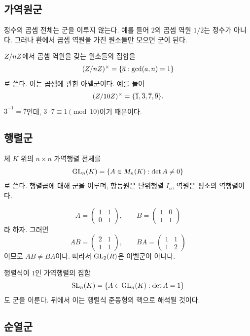 \subsection{가역원군}

정수의 곱셈 전체는 군을 이루지 않는다. 예를 들어 $2$의 곱셈 역원 $1/2$는 정수가 아니다. 그러나 환에서 곱셈 역원을 가진 원소들만 모으면 군이 된다.

\begin{example}
$Z/nZ$에서 곱셈 역원을 갖는 원소들의 집합을
\[
  (Z/nZ)^\times
  =\{\overline a:\gcd(a,n)=1\}
\]
로 쓴다. 이는 곱셈에 관한 아벨군이다. 예를 들어
\[
  (Z/10Z)^\times=\{\overline1,\overline3,\overline7,\overline9\}.
\]
$\overline3^{-1}=\overline7$인데, $3\cdot7\equiv1\pmod{10}$이기 때문이다.
\end{example}

\subsection{행렬군}

체 $K$ 위의 $n\times n$ 가역행렬 전체를
\[
  \operatorname{GL}_n(K)=\{A\in M_n(K):\det A\ne0\}
\]
로 쓴다. 행렬곱에 대해 군을 이루며, 항등원은 단위행렬 $I_n$, 역원은 평소의 역행렬이다.

\begin{example}
\[
 A=\begin{pmatrix}1&1\\0&1\end{pmatrix},\qquad
 B=\begin{pmatrix}1&0\\1&1\end{pmatrix}
\]
라 하자. 그러면
\[
 AB=\begin{pmatrix}2&1\\1&1\end{pmatrix},\qquad
 BA=\begin{pmatrix}1&1\\1&2\end{pmatrix}
\]
이므로 $AB\ne BA$이다. 따라서 $\operatorname{GL}_2(R)$은 아벨군이 아니다.
\end{example}

행렬식이 $1$인 가역행렬의 집합
\[
  \operatorname{SL}_n(K)=\{A\in\operatorname{GL}_n(K):\det A=1\}
\]
도 군을 이룬다. 뒤에서 이는 행렬식 준동형의 핵으로 해석될 것이다.

\subsection{순열군}

